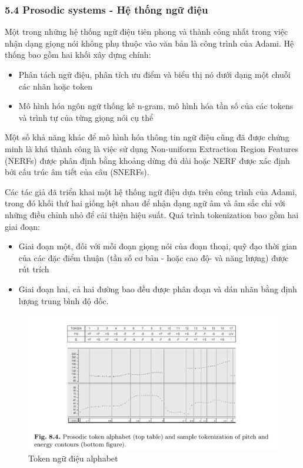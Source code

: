 \documentclass{article}
\begin{document}
	\subsubsection{5.4 Prosodic systems - Hệ thống ngữ điệu}
	\qquad Một trong những hệ thống ngữ điệu tiên phong và thành công nhất trong việc nhận dạng giọng nói không phụ thuộc vào văn bản là công trình của Adami. Hệ thống bao gồm hai khối xây dựng chính: 
	\begin{itemize}
		\item Phân tách ngữ điệu, phân tích ưu điểm và biểu thị nó dưới dạng một chuỗi các nhãn hoặc token
		\item Mô hình hóa ngôn ngữ thống kê n-gram, mô hình hóa tần số của các tokens và trình tự của từng giọng nói cụ thể
	\end{itemize}
	 
	 Một số khả năng khác để mô hình hóa thông tin ngữ điệu cũng đã được chứng minh là khá thành công là việc sử dụng Non-uniform Extraction Region Features (NERFs) được phân định bằng khoảng dừng đủ dài hoặc NERF được xác định bởi cấu trúc âm tiết của câu (SNERFs).
	
	Các tác giả đã triển khai một hệ thống ngữ điệu dựa trên công trình của Adami, trong đó khối thứ hai giống hệt nhau để nhận dạng ngữ âm và âm sắc chỉ với những điều chỉnh nhỏ để cải thiện hiệu suất. Quá trình tokenization bao gồm hai giai đoạn:
	\begin{itemize}
		\item Giai đoạn một, đối với mỗi đoạn giọng nói của đoạn thoại, quỹ đạo thời gian của các đặc điểm thuận (tần số cơ bản - hoặc cao độ- và năng lượng) được rút trích
		\item Giai đoạn hai, cả hai đường bao đều được phân đoạn và dán nhãn bằng định lượng trung bình độ dốc.
	\end{itemize}

	\begin{figure}[H]
		\centering
		\includegraphics[width=1\linewidth]{images/figure_8_4.png}
		\caption{Token ngữ điệu alphabet}
		\label{fig:writing-thesis}
	\end{figure}
\end{document}
